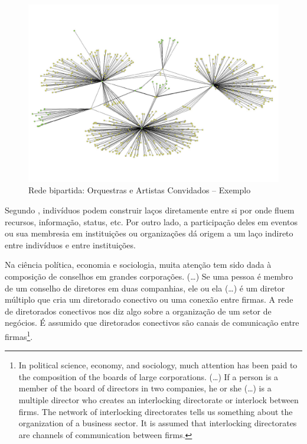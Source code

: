 \documentclass[a4paper, 12pt, openright, oneside, german, french, english, brazil, article]{abntex2}
\begin{document}
\begin{figure}[ht]
	\centering
	\caption{Rede bipartida: Orquestras e Artistas Convidados -- Exemplo}
	\includegraphics[scale=0.55]{rede_artistas_orquestras_PROVISORIO.pdf}
\end{figure}

Segundo , indivíduos podem construir laços diretamente entre si por onde fluem recursos, informação, status, etc. Por outro lado, a participação deles em eventos ou sua membresia em instituições ou organizações dá origem a um laço indireto entre indivíduos e entre instituições.

\begin{citacao}
	Na ciência política, economia e sociologia, muita atenção tem sido dada à composição de conselhos em grandes corporações. (\dots) Se uma pessoa é membro de um conselho de diretores em duas companhias, ele ou ela (\dots) é um diretor múltiplo que cria um diretorado conectivo ou uma conexão entre firmas. A rede de diretorados conectivos nos diz algo sobre a organização de um setor de negócios. É assumido que diretorados conectivos são canais de comunicação entre firmas\footnote{In political science, economy, and sociology, much attention has been paid to the composition of the boards of large corporations. (\dots) If a person is a member of the board of directors in two companies, he or she (\dots) is a multiple director who creates an interlocking directorate or interlock between firms. The network of interlocking directorates tells us something about the organization of a business sector. It is assumed that interlocking directorates are channels of communication between firms.}. \cite[p. 117]{denooy2011exploratory}
\end{citacao}
\end{document}

